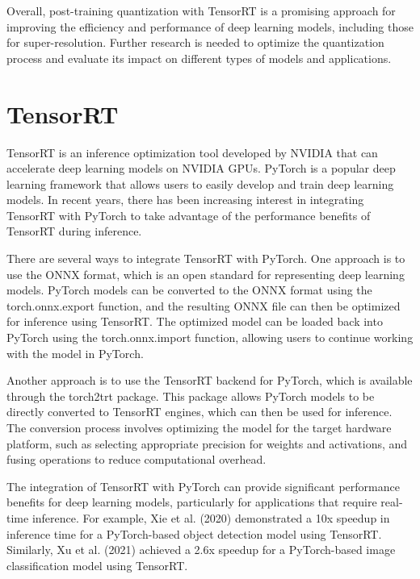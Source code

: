 Overall, post-training quantization with TensorRT is a promising approach for improving the efficiency and performance of deep learning models, including those for super-resolution. Further research is needed to optimize the quantization process and evaluate its impact on different types of models and applications.

\section{TensorRT}
\label{sec:tensorrt}
TensorRT is an inference optimization tool developed by NVIDIA that can accelerate deep learning models on NVIDIA GPUs. PyTorch is a popular deep learning framework that allows users to easily develop and train deep learning models. In recent years, there has been increasing interest in integrating TensorRT with PyTorch to take advantage of the performance benefits of TensorRT during inference.

There are several ways to integrate TensorRT with PyTorch. One approach is to use the ONNX format, which is an open standard for representing deep learning models. PyTorch models can be converted to the ONNX format using the torch.onnx.export function, and the resulting ONNX file can then be optimized for inference using TensorRT. The optimized model can be loaded back into PyTorch using the torch.onnx.import function, allowing users to continue working with the model in PyTorch.

Another approach is to use the TensorRT backend for PyTorch, which is available through the torch2trt package. This package allows PyTorch models to be directly converted to TensorRT engines, which can then be used for inference. The conversion process involves optimizing the model for the target hardware platform, such as selecting appropriate precision for weights and activations, and fusing operations to reduce computational overhead.

The integration of TensorRT with PyTorch can provide significant performance benefits for deep learning models, particularly for applications that require real-time inference. For example, Xie et al. (2020) demonstrated a 10x speedup in inference time for a PyTorch-based object detection model using TensorRT. Similarly, Xu et al. (2021) achieved a 2.6x speedup for a PyTorch-based image classification model using TensorRT.

